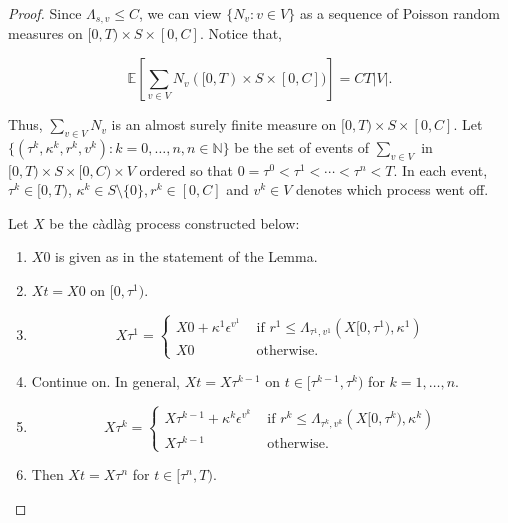 \documentclass[12pt]{article}
\newcommand{\mb}{\mathbb}
\newcommand{\te}{\text}
\newcommand{\ep}{\epsilon}
\newcommand{\ind}{\hspace{24pt}}
\newcommand{\ex}[1]{\mb{E}\left[#1\right]}			%
\renewcommand{\v}{v}							%
\renewcommand{\S}{S}							%
\newcommand{\ev}[1]{\ep^{#1}}					%
\newcommand{\T}{T}								%
\renewcommand{\t}{t}							%
\renewcommand{\tt}{s}							%
\newcommand{\X}{X}								%
\newcommand{\const}{C}							%
\newcommand{\poiss}[1]{N_{#1}}						%
\renewcommand{\r}{r}								%
\newcommand{\rt}[1]{\tau^{#1}}						%
\renewcommand{\it}{k}								%
\newcommand{\ratee}[1]{\Lambda_{#1}}				%
\renewcommand{\mark}[1]{\kappa^{#1}}				%
\begin{document}
\begin{proof}
Since \(\ratee{\tt,\v} \leq \const{}\), we can view \(\{\poiss{\v}:\v\in V\}\) as a sequence of Poisson random measures on \([0,\T)\times \S\times [0,\const{}]\). Notice that,

\[\ex{\sum_{\v\in V}\poiss{\v}([0,\T)\times\S\times[0,\const{}])} = \const{}\T| V|.\]

Thus, \(\sum_{\v\in V}\poiss{\v}\) is an almost surely finite measure on \([0,\T)\times \S\times [0,\const{}]\). Let \(\{(\rt{\it},\mark{\it},\r^\it,\v^\it):\it = 0,\dots,n, n\in \mb{N}\}\) be the set of events of \(\sum_{\v\in V}\) in \([0,\T)\times\S\times [0,\const{})\times  V\) ordered so that \(0=\rt{0} < \rt{1} < \cdots < \rt{n} < \T\). In each event, \(\rt{\it} \in [0,\T)\), \(\mark{\it}\in \S\setminus\{0\}, \r^\it \in [0,\const{}]\) and \(\v^\it \in  V\) denotes which process went off.

\ind Let \(\X{}{}\) be the c\`adl\`ag process constructed below:

\begin{enumerate}
\item \(\X{}{0}\) is given as in the statement of the Lemma.

\item \(\X{}{\t} = \X{}{0}\) on \([0,\rt{1})\).

\item 

\[\X{}{\rt{1}} = \begin{cases}
\X{}{0} + \mark{1}\ev{\v^1} &\te{ if } \r^1 \leq \ratee{\rt{1},\v^1}(\X{}{[0,\rt{1})},\mark{1})\\
\X{}{0} &\te{ otherwise.}
\end{cases}
\] 

\item Continue on. In general, \(\X{}{\t} = \X{}{\rt{\it-1}}\) on \(\t \in [\rt{\it-1},\rt{\it})\) for \(\it= 1,\dots,n\).

\item 

\[\X{}{\rt{\it}} = \begin{cases}
\X{}{\rt{\it-1}} + \mark{\it}\ev{\v^\it} &\te{ if } \r^\it \leq \ratee{\rt{\it},\v^\it}(\X{}{[0,\rt{\it})},\mark{\it})\\
\X{}{\rt{\it-1}} &\te{ otherwise.}
\end{cases}\]

\item Then \(\X{}{\t} = \X{}{\rt{n}}\) for \(\t\in [\rt{n},\T)\).
\end{enumerate}


\end{proof}
\end{document}
